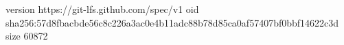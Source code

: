 version https://git-lfs.github.com/spec/v1
oid sha256:57d8fbacbde56c8c226a3ac0e4b11adc88b78d85ca0af57407bf0bbf14622c3d
size 60872
